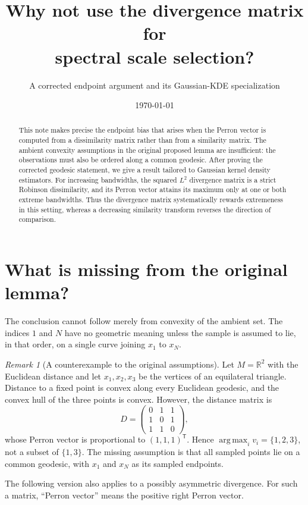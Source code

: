 \documentclass[11pt,a4paper]{article}
\title{\vspace{-14mm}\textbf{Why not use the divergence matrix for\\spectral scale selection?}}
\author{A corrected endpoint argument and its Gaussian-KDE specialization}
\date{\today}
\theoremstyle{clean}
\theoremstyle{remark}
\newtheorem{remark}[definition]{Remark}
\newcommand{\R}{\mathbb{R}}
\newcommand{\argmax}{\operatorname*{arg\,max}}
\begin{document}
\maketitle

\begin{abstract}
This note makes precise the endpoint bias that arises when the Perron vector is
computed from a dissimilarity matrix rather than from a similarity matrix.  The
ambient convexity assumptions in the original proposed lemma are insufficient:
the observations must also be ordered along a common geodesic.  After proving
the corrected geodesic statement, we give a result tailored to Gaussian kernel
density estimators.  For increasing bandwidths, the squared $L^2$ divergence
matrix is a strict Robinson dissimilarity, and its Perron vector attains its
maximum only at one or both extreme bandwidths.  Thus the divergence matrix
systematically rewards extremeness in this setting, whereas a decreasing
similarity transform reverses the direction of comparison.
\end{abstract}

\section{What is missing from the original lemma?}

The conclusion cannot follow merely from convexity of the ambient set.  The
indices $1$ and $N$ have no geometric meaning unless the sample is assumed to
lie, in that order, on a single curve joining $x_1$ to $x_N$.

\begin{remark}[A counterexample to the original assumptions]
Let $M=\R^2$ with the Euclidean distance and let $x_1,x_2,x_3$ be the vertices
of an equilateral triangle.  Distance to a fixed point is convex along every
Euclidean geodesic, and the convex hull of the three points is convex.  However,
the distance matrix is
\[
  D=\begin{pmatrix}0&1&1\\1&0&1\\1&1&0\end{pmatrix},
\]
whose Perron vector is proportional to $(1,1,1)^\mathsf{T}$.  Hence
$\argmax_i v_i=\{1,2,3\}$, not a subset of $\{1,3\}$.  The missing assumption is
that all sampled points lie on a common geodesic, with $x_1$ and $x_N$ as its
sampled endpoints.
\end{remark}

The following version also applies to a possibly asymmetric divergence.  For
such a matrix, ``Perron vector'' means the positive right Perron vector.
\end{document}
